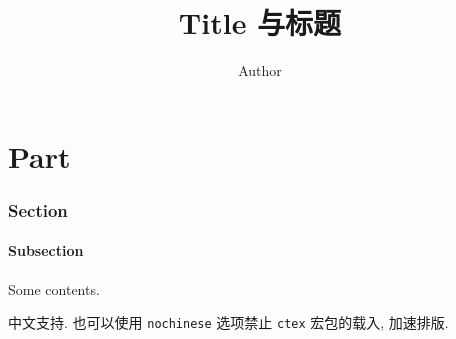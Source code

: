 \documentclass[english]{note}
\title{Title 与标题}
\author{Author}
\begin{document}
\maketitle

\tableofcontents





\part{Part}

\section{Section}

\lipsum[1]

\subsection{Subsection}

Some contents. \parencite{Bibtexkey}

中文支持. 也可以使用 \verb"nochinese" 选项禁止 \verb"ctex" 宏包的载入, 加速排版.

\printbibliography[heading=bibintoc]
\end{document}
